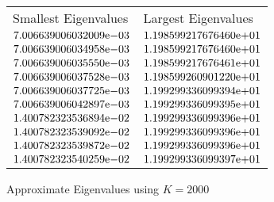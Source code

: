 \begin{enumerate}
\begin{figure}[tbh]
 \centering    
\begin{tabular}{ ||p{6cm}||p{6cm}|}
\hline
 Smallest Eigenvalues & Largest Eigenvalues \\ \hhline{|=|=|}    
\hline
${7.006639006032009}\mathrm{e}{-03}$ & ${1.198599217676460}\mathrm{e}{+01}$ \\  
${7.006639006034958}\mathrm{e}{-03}$ & ${1.198599217676460}\mathrm{e}{+01}$ \\  
${7.006639006035550}\mathrm{e}{-03}$ & ${1.198599217676461}\mathrm{e}{+01}$ \\  
${7.006639006037528}\mathrm{e}{-03}$ & ${1.198599260901220}\mathrm{e}{+01}$ \\  
${7.006639006037725}\mathrm{e}{-03}$ & ${1.199299336099394}\mathrm{e}{+01}$ \\  
${7.006639006042897}\mathrm{e}{-03}$ & ${1.199299336099395}\mathrm{e}{+01}$ \\  
${1.400782323536894}\mathrm{e}{-02}$ & ${1.199299336099396}\mathrm{e}{+01}$ \\  
${1.400782323539092}\mathrm{e}{-02}$ & ${1.199299336099396}\mathrm{e}{+01}$ \\  
${1.400782323539872}\mathrm{e}{-02}$ & ${1.199299336099396}\mathrm{e}{+01}$ \\  
${1.400782323540259}\mathrm{e}{-02}$ & ${1.199299336099397}\mathrm{e}{+01}$ \\  
\hline  
\end{tabular} 
\caption{Approximate Eigenvalues using $K = 2000$}
   \label{tab:app_eig_2000}
\end{figure} 



\end{enumerate}
